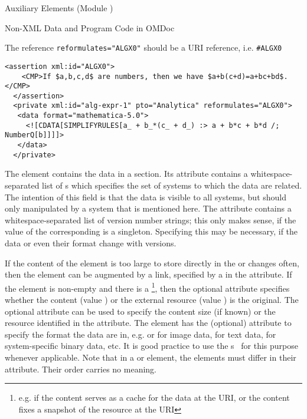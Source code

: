 \begin{tchapter}[id=ext,short=Auxiliary Elements]{Auxiliary Elements (Module {})}
\begin{tsection}[id=private]{Non-XML Data and Program Code in OMDoc}
\begin{erratum}[reported-by=Christoph Lange,date=2006-07-27]{The reference
    {\tt{reformulates="ALGX0"}} should be a URI reference, i.e. {\tt{\#ALGX0}}}
\begin{lstlisting}[label=lst:private-simplify,mathescape,
  caption={Reformulating Mathematical Knowledge},index={private,data}]
  <assertion xml:id="ALGX0">
    <CMP>If $a,b,c,d$ are numbers, then we have $a+b(c+d)=a+bc+bd$.</CMP>
  </assertion>
  <private xml:id="alg-expr-1" pto="Analytica" reformulates="ALGX0">
   <data format="mathematica-5.0">
     <![CDATA[SIMPLIFYRULES[a_ + b_*(c_ + d_) :> a + b*c + b*d /; NumberQ[b]]]]>
   </data>
  </private>
\end{lstlisting}
\end{erratum}

The {} element contains the data in a {} section.  Its
{} attribute contains a whitespace-separated list of
{s} which specifies the set of systems to which the data are
related.  The intention of this field is that the data is visible to all systems, but
should only manipulated by a system that is mentioned here. The
{} attribute contains a whitespace-separated list of version
number strings; this only makes sense, if the value of the corresponding
{} is a singleton. Specifying this may be necessary, if the data or
even their format change with versions.

If the content of the {} element is too large to store directly in the
{\omdoc} or changes often, then the {} element can be augmented by a link,
specified by a {} in the {} attribute. If
the {} element is non-empty and there is a
{}\footnote{e.g. if the {} content serves as a cache
  for the data at the URI, or the {} content fixes a snapshot of the
  resource at the URI}, then the optional attribute {} specifies
whether the {} content (value {}) or the
external resource (value {}) is the original. The
optional {} attribute can be used to specify the content size (if
known) or the resource identified in the {} attribute. The
{} element has the (optional) attribute {} to
specify the format the data are in, e.g.  {} or
{} for image data, {} for
text data, {} for system-specific binary data, etc. It is
good practice to use the {s}~\cite{FreBor:MIME96} for this purpose
whenever applicable.  Note that in a {} or {} element, the
{} elements must differ in their {} attribute. Their
order carries no meaning.


\end{tsection}
\end{tchapter}

